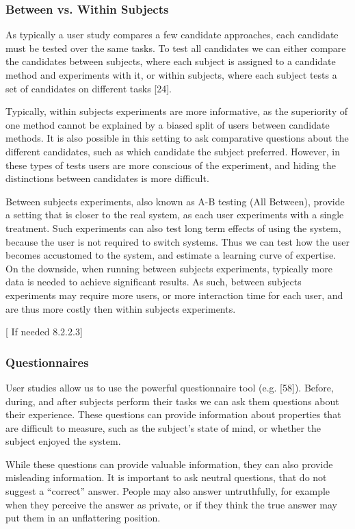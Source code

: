 \subsubsection{Between vs. Within Subjects}

As typically a user study compares a few candidate approaches, each candidate must be tested over the same tasks. To test all candidates we can either compare the candidates between subjects, where each subject is assigned to a candidate method and experiments with it, or within subjects, where each subject tests a set of candidates on different tasks [24].

Typically, within subjects experiments are more informative, as the superiority of one method cannot be explained by a biased split of users between candidate methods. It is also possible in this setting to ask comparative questions about the different candidates, such as which candidate the subject preferred. However, in these types of tests users are more conscious of the experiment, and hiding the distinctions between candidates is more difficult.

Between subjects experiments, also known as A-B testing (All Between), provide a setting that is closer to the real system, as each user experiments with a single treatment. Such experiments can also test long term effects of using the system, because the user is not required to switch systems. Thus we can test how the user becomes accustomed to the system, and estimate a learning curve of expertise. On the downside, when running between subjects experiments, typically more data is needed to achieve significant results. As such, between subjects experiments may require more users, or more interaction time for each user, and are thus more costly then within subjects experiments.

[ If needed 8.2.2.3]

\subsubsection{Questionnaires}

User studies allow us to use the powerful questionnaire tool (e.g. [58]). Before, during, and after subjects perform their tasks we can ask them questions about their experience. These questions can provide information about properties that are difficult to measure, such as the subject’s state of mind, or whether the subject enjoyed the system.

While these questions can provide valuable information, they can also provide misleading information. It is important to ask neutral questions, that do not suggest a “correct” answer. People may also answer untruthfully, for example when they perceive the answer as private, or if they think the true answer may put them in an unflattering position.

